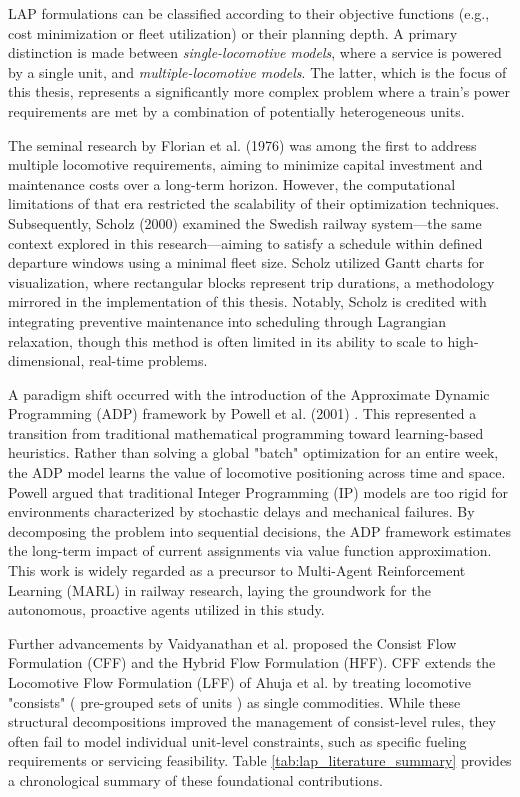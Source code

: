 \documentclass[a4paper]{scrartcl}
\begin{document}
LAP formulations can be classified according to their objective functions (e.g., cost minimization or fleet utilization) or their planning depth. A primary distinction is made between \textit{single-locomotive models}, where a service is powered by a single unit, and \textit{multiple-locomotive models}. The latter, which is the focus of this thesis, represents a significantly more complex problem where a train's power requirements are met by a combination of potentially heterogeneous units. 

The seminal research by Florian et al. (1976) \cite{Florianetal1976} was among the first to address multiple locomotive requirements, aiming to minimize capital investment and maintenance costs over a long-term horizon. However, the computational limitations of that era restricted the scalability of their optimization techniques. Subsequently, Scholz (2000) \cite{Scholz2000} examined the Swedish railway system—the same context explored in this research—aiming to satisfy a schedule within defined departure windows using a minimal fleet size. Scholz utilized Gantt charts for visualization, where rectangular blocks represent trip durations, a methodology mirrored in the implementation of this thesis. Notably, Scholz is credited with integrating preventive maintenance into scheduling through Lagrangian relaxation, though this method is often limited in its ability to scale to high-dimensional, real-time problems.

A paradigm shift occurred with the introduction of the Approximate Dynamic Programming (ADP) framework by Powell et al. (2001) \cite{Powelletal2001}. This represented a transition from traditional mathematical programming toward learning-based heuristics. Rather than solving a global "batch" optimization for an entire week, the ADP model learns the value of locomotive positioning across time and space. Powell argued that traditional Integer Programming (IP) models are too rigid for environments characterized by stochastic delays and mechanical failures. By decomposing the problem into sequential decisions, the ADP framework estimates the long-term impact of current assignments via value function approximation. This work is widely regarded as a precursor to Multi-Agent Reinforcement Learning (MARL) in railway research, laying the groundwork for the autonomous, proactive agents utilized in this study.

Further advancements by Vaidyanathan et al. \cite{Vaidyanathanetal2008a} proposed the Consist Flow Formulation (CFF) and the Hybrid Flow Formulation (HFF). CFF extends the Locomotive Flow Formulation (LFF) of Ahuja et al. \cite{Ahujaetal2005b} by treating locomotive "consists" ( pre-grouped sets of units ) as single commodities. While these structural decompositions improved the management of consist-level rules, they often fail to model individual unit-level constraints, such as specific fueling requirements or servicing feasibility. Table \ref{tab:lap_literature_summary} provides a chronological summary of these foundational contributions.
\end{document}
